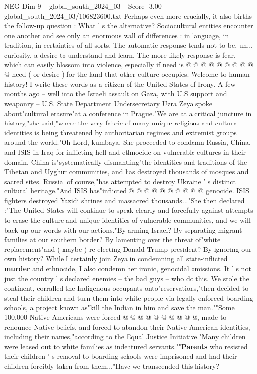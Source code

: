 \begin{textsample}{NEG Dim 9 – global\_south\_2024\_03 – Score -3.00 – global\_south\_2024\_03/106823600.txt}
Perhaps even more crucially, it also births the follow-up question : What ' s the alternative?
Sociocultural entities encounter one another and see only an enormous wall of differences : in language, in tradition, in certainties of all sorts.
The automatic response tends not to be, uh... curiosity, a desire to understand and learn.
The more likely response is fear, which can easily blossom into violence, especially if need is @ @ @ @ @ @ @ @ @ @ need ( or desire ) for the land that other culture occupies.
Welcome to human history!
I write these words as a citizen of the United States of Irony.
A few months ago -- well into the Israeli assault on Gaza, with U.S support and weaponry -- U.S.
State Department Undersecretary Uzra Zeya spoke about"cultural erasure"at a conference in Prague."We are at a critical juncture in history,"she said,"where the very fabric of many unique religious and cultural identities is being threatened by authoritarian regimes and extremist groups around the world."Oh Lord, kumbaya.
She proceeded to condemn Russia, China, and ISIS in Iraq for inflicting hell and ethnocide on vulnerable cultures in their domain.
China is"systematically dismantling"the identities and traditions of the Tibetan and Uyghur communities, and has destroyed thousands of mosques and sacred sites.
Russia, of course,"has attempted to destroy Ukraine ' s distinct cultural heritage."And ISIS has"inflicted @ @ @ @ @ @ @ @ @ @ genocide.
ISIS fighters destroyed Yazidi shrines and massacred thousands..."She then declared :"The United States will continue to speak clearly and forcefully against attempts to erase the culture and unique identities of vulnerable communities, and we will back up our words with our actions."By arming Israel?
By separating migrant families at our southern border?
By lamenting over the threat of"white replacement"and ( maybe ) re-electing Donald Trump president?
By ignoring our own history?
While I certainly join Zeya in condemning all state-inflicted \textbf{murder} and ethnocide, I also condemn her ironic, genocidal omissions.
It ' s not just the country ' s declared enemies -- the bad guys -- who do this.
We stole the continent, corralled the Indigenous occupants onto"reservations,"then decided to steal their children and turn them into white people via legally enforced boarding schools, a project known as"kill the Indian in him and save the man.""Some 100,000 Native Americans were forced @ @ @ @ @ @ @ @ @ @, made to renounce Native beliefs, and forced to abandon their Native American identities, including their names,"according to the Equal Justice Initiative."Many children were leased out to white families as indentured servants.""\textbf{Parents} who resisted their children ' s removal to boarding schools were imprisoned and had their children forcibly taken from them..."Have we transcended this history?

\end{textsample}
